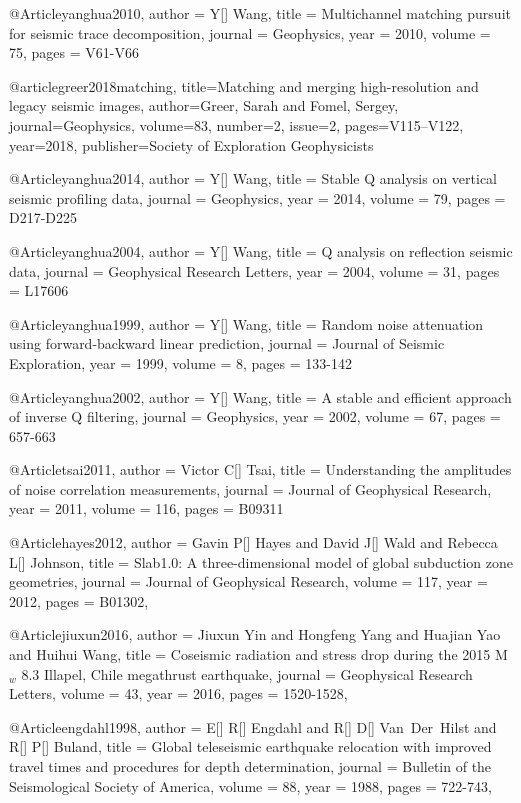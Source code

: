 @Article{yanghua2010,
  author = 	 {Y[] Wang},
  title = 	 {Multichannel matching pursuit for seismic trace decomposition},
  journal = 	 {Geophysics},
  year = 	 2010,
  volume =	 75,
  pages =	 {V61-V66}
}

@article{greer2018matching,
  title={Matching and merging high-resolution and legacy seismic images},
  author={Greer, Sarah and Fomel, Sergey},
  journal={Geophysics},
  volume={83},
  number=2,
  issue=2,
  pages={V115--V122},
  year={2018},
  publisher={Society of Exploration Geophysicists}
}

@Article{yanghua2014,
  author = 	 {Y[] Wang},
  title = 	 {Stable Q analysis on vertical seismic profiling data},
  journal = 	 {Geophysics},
  year = 	 2014,
  volume =	 79,
  pages =	 {D217-D225}
}

@Article{yanghua2004,
  author = 	 {Y[] Wang},
  title = 	 {Q analysis on reflection seismic data},
  journal = 	 {Geophysical Research Letters},
  year = 	 2004,
  volume =	 31,
  pages =	 {L17606}
}

@Article{yanghua1999,
  author = 	 {Y[] Wang},
  title = 	 {Random noise attenuation using forward-backward linear prediction},
  journal = 	 {Journal of Seismic Exploration},
  year = 	 1999,
  volume =	 8,
  pages =	 {133-142}
}

@Article{yanghua2002,
  author = 	 {Y[] Wang},
  title = 	 {A stable and efficient approach of inverse Q filtering},
  journal = 	 {Geophysics},
  year = 	 2002,
  volume = 67,
  pages =	 {657-663}
}

@Article{tsai2011,
  author = 	 {Victor C[] Tsai},
  title = 	 {Understanding the amplitudes of noise correlation measurements},
  journal = 	 {Journal of Geophysical Research},
  year = 	 2011,
  volume = 116,
  pages =	 {B09311}
}

@Article{hayes2012,
  author =	 { Gavin P[] Hayes and David J[] Wald and Rebecca L[] Johnson},
  title =	 {Slab1.0: A three-dimensional model of global subduction zone geometries},
  journal =	 {Journal of Geophysical Research},
  volume =	 117,
  year =	 2012,
  pages =	 {B01302},
}

@Article{jiuxun2016,
  author =	 { Jiuxun Yin and Hongfeng Yang and Huajian Yao and Huihui Wang},
  title =	 {Coseismic radiation and stress drop during the 2015 {M}$_w$ 8.3 {I}llapel, {C}hile megathrust earthquake},
  journal =	 {Geophysical Research Letters},
  volume =	 43,
  year =	 2016,
  pages =	 {1520-1528},
}

@Article{engdahl1998,
  author =	 {E[] R[] Engdahl and R[] D[]  Van~Der~Hilst and R[] P[] Buland},
  title =	 {Global teleseismic earthquake relocation with improved travel times and procedures for depth determination},
  journal =	 {Bulletin of the Seismological Society of America},
  volume =	 88,
  year =	 1988,
  pages =	 {722-743},
}

